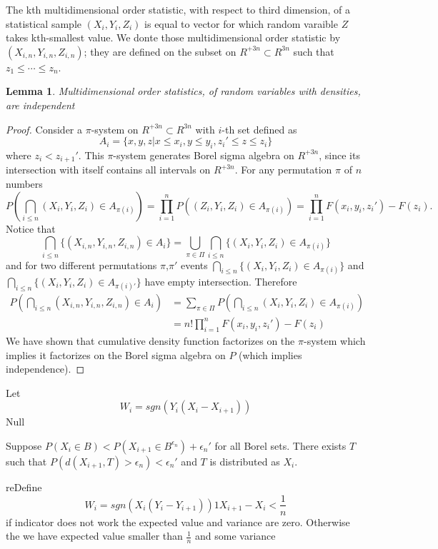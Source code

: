 \documentclass{article}
\newtheorem{lemma}{Lemma}
\begin{document}
The kth multidimensional order statistic, with respect to third dimension, of a statistical sample $(X_i,Y_i,Z_i)$  is equal to vector for which random varaible $Z$ takes kth-smallest value. We donte those multidimensional order statistic by $ (X_{i,n},Y_{i,n},Z_{i,n}) $; they are defined on the subset on $R^{+3n} \subset R^{3n}$ such that $z_1\leq \cdots \leq z_n$.  

\begin{lemma}
\label{lem:orderStats}
 Multidimensional order statistics, of random variables with densities, are independent
\end{lemma}
\begin{proof}
 Consider a $\pi$-system on  $R^{+3n} \subset R^{3n}$ with $i$-th set defined as
 \[
  A_i = \{ x,y,z  |  x \leq x_i,  y  \leq y_{i},z_i' \leq z \leq z_i \} 
 \]
where $z_{i} < z_{i+1}'$.  This $\pi$-system generates Borel sigma algebra on $R^{+3n}$, since its intersection with itself contains all intervals on $R^{+3n}$.  For any permutation $\pi$ of $n$ numbers
\[
  P( \bigcap_{i \leq n} (X_i,Y_i,Z_i) \in A_{\pi(i)}) = \prod_{i=1}^n P( (Z_i,Y_i,Z_i) \in A_ {\pi(i)}) = \prod_{i=1}^n F(x_{i},y_{i},z_{i}') - F(z_{i}) .
\]
Notice that 
\[
 \bigcap_{i \leq n} \{ (X_{i,n},Y_{i,n},Z_{i,n}) \in A_i \} = \bigcup_{\pi \in \Pi}   \bigcap_{i \leq n} \{ (X_i,Y_i,Z_i) \in A_{\pi(i)} \}
\]
and for two different permutations $\pi$,$\pi'$ events  $\bigcap_{i \leq n} \{ (X_i,Y_i,Z_i) \in A_{\pi(i)} \}$ and $\bigcap_{i \leq n} \{ (X_i,Y_i,Z_i) \in A_{\pi(i)'} \}$  have empty intersection. Therefore
\begin{align*}
  P( \bigcap_{i \leq n} (X_{i,n},Y_{i,n},Z_{i,n}) \in A_i ) &=  \sum_{\pi \in \Pi}   P( \bigcap_{i \leq n} (X_i,Y_i,Z_i) \in A_{\pi(i)})  \\ 
 & =  n!  \prod_{i=1}^n F(x_{i},y_{i},z_{i}') - F(z_{i})   
\end{align*}
We have shown that cumulative density function factorizes on the $\pi$-system  which implies it factorizes on the Borel sigma algebra on $P$ (which implies independence).
\end{proof}
 Let
\[
 W_i = sgn(Y_i(X_i - X_{i+1}))
\]
Null


Suppose $P(X_i \in B )< P(X_{i+1} \in B^{\epsilon_n} ) + \epsilon_n'$ for all Borel sets. There exists $T$ such that 
$P(d(X_{i+1},T)>\epsilon_n)< \epsilon_n'$ and $T $ is distributed as $X_i$.	


reDefine 
 \[
W_i = sgn(X_i(Y_i - Y_{i+1}))1{ X_{i+1} - X_i < \frac 1 n  }  
 \]
if indicator does not work the expected value and variance are zero.  Otherwise the we have expected value smaller than $\frac 1 n$ and some variance 
\end{document}
